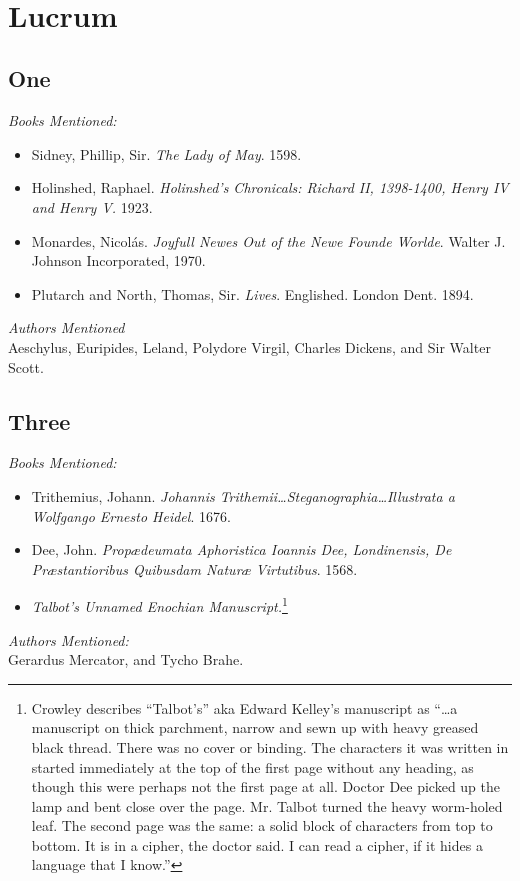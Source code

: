\documentclass[twoside,10pt]{report}
\newcommand\fleuron{\begin{turn}{45}\Large \ding{166}\end{turn}}
\newcommand\doublefleuron{%
	\reflectbox{\fleuron}\AC\staveXLIX\reflectbox{\AC}\fleuron}
\newcommand\fleuronbar{%
	{\huge\LinearACCCXIII}\xrfill[1.3ex]{1pt}\doublefleuron\xrfill[1.3ex]{1pt}\reflectbox{\huge\LinearACCCXIII}}
\newcommand\nbvspace[1][3]{\vspace*{\stretch{#1}}}
\begin{document}
\begin{center}
\vfill
\shadowoffset{1pt}
\shadowtext{%
{\color{Mahogany}\fontsize{60}{64}\staveXXIX}}\\
\nbvspace[1]
\end{center}

\chapter{Lucrum}
\section{One}
\textit{Books Mentioned:}
\begin{itemize}
\item Sidney, Phillip, Sir. \textit{The Lady of May}. 1598.\cite{Sidney1598}
\item Holinshed, Raphael. \textit{Holinshed’s Chronicals: Richard II, 1398-1400, Henry IV and Henry V.} 1923.\cite{Holinshed1923}
\item Monardes, Nicolás. \textit{Joyfull Newes Out of the Newe Founde Worlde}. Walter J. Johnson Incorporated, 1970.\cite{Monardes1970}
\item Plutarch and North, Thomas, Sir. \textit{Lives}. Englished. London Dent. 1894.\cite{Plutarch1894}
\end{itemize}
\textit{Authors Mentioned}\\
Aeschylus, Euripides, Leland, Polydore Virgil, Charles Dickens, and Sir Walter Scott.

\section{Three}
\textit{Books Mentioned:}
\begin{itemize}
\item Trithemius, Johann. \textit{Johannis Trithemii\ldots Steganographia\ldots Illustrata a Wolfgango Ernesto Heidel}. 1676.\cite{Trithemius}
\item Dee, John. \textit{Propædeumata Aphoristica Ioannis Dee, Londinensis, De Præstantioribus Quibusdam Naturæ Virtutibus}. 1568.\cite{Dee1568}
\item \textit{Talbot’s Unnamed Enochian Manuscript.}\footnote{Crowley describes “Talbot’s” aka Edward Kelley’s manuscript as “\ldots a manuscript on thick parchment, narrow and sewn up with heavy greased black thread. There was no cover or binding. The characters it was written in started immediately at the top of the first page without any heading, as though this were perhaps not the first page at all. Doctor Dee picked up the lamp and bent close over the page. Mr. Talbot turned the heavy worm-holed leaf. The second page was the same: a solid block of characters from top to bottom. It is in a cipher, the doctor said. I can read a cipher, if it hides a language that I know.”}
\end{itemize}
\textit{Authors Mentioned:}\\
Gerardus Mercator, and Tycho Brahe.
\end{document}
